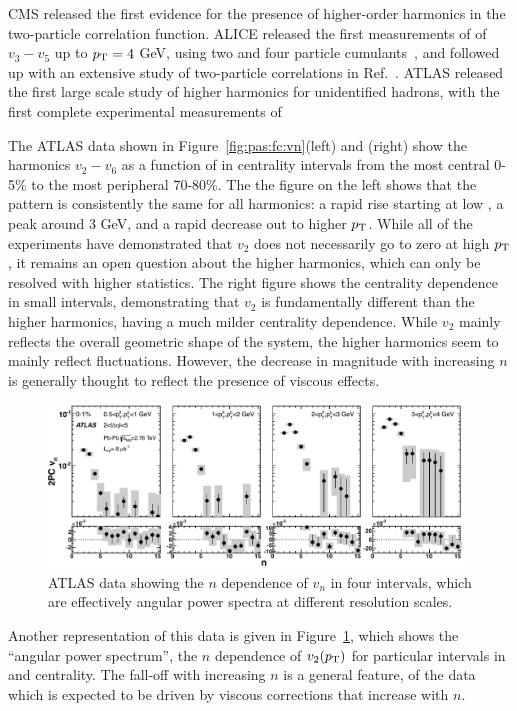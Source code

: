 CMS released the first evidence for the presence of higher-order harmonics in the two-particle
correlation function.  ALICE released the first measurements of of $v_3-v_5$ up to $\mbox{$p_{\mathrm{T}}$}=4$ GeV,
using two and four particle cumulants~\cite{ALICE:2011ab}, and followed up with an extensive study of two-particle
correlations in Ref.~\cite{Aamodt:2011by}.
ATLAS released the first large scale study of higher harmonics
for unidentified hadrons, with the first complete experimental measurements of

The ATLAS data shown in Figure~\ref{fig:pas:fc:vn}(left) and (right) show the harmonics $v_2 - v_6$ as
a function of \pT in centrality intervals from the most central 0-5\% to the most peripheral 70-80\%.
The the figure on the left shows that the pattern is consistently the same for all harmonics:
a rapid rise starting at low \pT, a peak around 3 GeV, and a
rapid decrease out to higher $\mbox{$p_{\mathrm{T}}$}$.  While all of the experiments have demonstrated that $v_2$ does not
necessarily go to zero at high $\mbox{$p_{\mathrm{T}}$}$, it remains an open question about the higher harmonics, which can
only be resolved with higher statistics.
The right figure shows the centrality dependence in small \pT intervals, demonstrating that $v_2$ is fundamentally
different than the higher harmonics, having a much milder centrality dependence.  While $v_2$ mainly reflects
the overall geometric shape of the system, the higher harmonics seem to mainly reflect fluctuations.
However, the decrease in magnitude with increasing $n$ is generally thought to reflect the presence of viscous effects.

\begin{figure}[!tb]
\begin{center}
\includegraphics[width=0.98\textwidth]{flowcorrelations_figs/atlas_vn_fig_13.pdf}
\caption[]{
ATLAS data showing the $n$ dependence of $v_n$ in four \pT intervals, which are effectively
angular power spectra at different resolution scales.
}
\label{fig:pas:fc:powerspec}
\end{center}
\end{figure}
Another representation of this data is given in Figure~\ref{fig:pas:fc:powerspec}, which shows the ``angular power spectrum'',
the $n$ dependence of $v_2(\mbox{$p_{\mathrm{T}}$})$ for particular intervals in \pT and centrality.  The fall-off with increasing $n$ is a general
feature, of the data which is expected to be driven by viscous corrections that increase with $n$.

